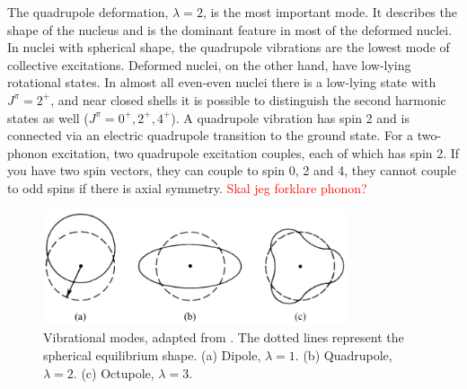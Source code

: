 \documentclass[twoside,english]{uiofysmaster/uiofysmaster}
\begin{document}
The quadrupole deformation, $\lambda = 2$, is the most important mode.
It describes the shape of the nucleus and is the dominant feature in most of the deformed nuclei. 
In nuclei with spherical shape, the quadrupole vibrations are the lowest mode of collective excitations.
Deformed nuclei, on the other hand, have low-lying rotational states.
In almost all even-even nuclei there is a low-lying state with $J^\pi = 2^+$, and near closed shells it is possible to distinguish the second harmonic states as well ($J^\pi = 0^+, 2^+, 4^+$). 
A quadrupole vibration has spin 2 and is connected via an electric quadrupole transition to the ground state. 
For a two-phonon excitation, two quadrupole excitation couples, each of which has spin 2.
If you have two spin vectors, they can couple to spin 0, 2 and 4, they cannot couple to odd spins if there is axial symmetry.
\textcolor{red}{Skal jeg forklare phonon?}

\begin{figure}[ht]
	\centering
	\includegraphics[width=0.8\textwidth]{Images/vibration-modes-3.png}
	\caption{Vibrational modes, adapted from \cite{Krane}. The dotted lines represent the spherical equilibrium shape.
	(a) Dipole, $\lambda = 1$. 
	(b) Quadrupole, $\lambda = 2$. 
	(c) Octupole, $\lambda = 3$.}
	\label{fig:vibrational-modes}
\end{figure}
\end{document}
